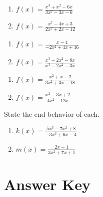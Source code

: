 \begin{multicols}{2}
\begin{enumerate}	\setcounter{enumi}{\value{Review}}
	\item $f(x) = \frac{x^3+x^2-6x}{3x^2-3x-6}$
	\item $f(x) = \frac{x^2-4x+3}{2x^2+2x-12}$
\end{enumerate} \setcounter{Review}{\value{enumi}}
\end{multicols}
\begin{multicols}{2}
\begin{enumerate}	\setcounter{enumi}{\value{Review}}
	\item $f(x) = \frac{x-4}{-2x^2+4x+16}$
	\item $f(x) = \frac{x^3-2x^2-8x}{x^3-2x^2-3x}$
\end{enumerate} \setcounter{Review}{\value{enumi}}
\end{multicols}
\begin{multicols}{2}
\begin{enumerate}	\setcounter{enumi}{\value{Review}}
	\item $f(x) = \frac{x^2+x-2}{3x^2+3x-18}$
	\item $f(x) = \frac{x^2-3x+2}{4x^2-12x}$
\end{enumerate}	\setcounter{Review}{\value{enumi}}
\end{multicols}
\vspace{0.25in}

State the end behavior of each.
\begin{enumerate}	\setcounter{enumi}{\value{Review}}
	\item $k(x) = \frac{5x^3-7x^2+8}{-3x^3+6x-4}$
	\item $m(x) = \frac{2x-1}{3x^2+7x+1}$
\end{enumerate}

\newpage

\section{Answer Key}

